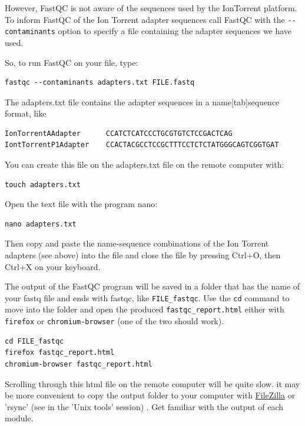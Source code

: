 \documentclass[11pt]{article}
\begin{document}
However, FastQC is not aware of the sequences used by the IonTorrent
platform. To inform FastQC of the Ion Torrent adapter sequences
call FastQC with the \texttt{-{}-contaminants} option to specify a file
containing the adapter sequences we have used.

So, to run FastQC on your file, type:

\begin{verbatim}
fastqc --contaminants adapters.txt FILE.fastq
\end{verbatim}

The adapters.txt file contains the adapter sequences in a
name[tab]sequence format, like

\begin{verbatim}
IonTorrentAAdapter      CCATCTCATCCCTGCGTGTCTCCGACTCAG
IontTorrentP1Adapter    CCACTACGCCTCCGCTTTCCTCTCTATGGGCAGTCGGTGAT
\end{verbatim}

You can create this file on the adapters.txt file on the remote computer with:

\begin{verbatim}
touch adapters.txt
\end{verbatim}

Open the text file with the program nano:

\begin{verbatim}
nano adapters.txt
\end{verbatim}

Then copy and paste the name-sequence combinations of the Ion Torrent
adapters (see above) into the file and close the file by pressing
Ctrl+O, then Ctrl+X on your keyboard.

The output of the FastQC program will be saved in a folder that has
the name of your fastq file and ends with fastqc, like
\texttt{FILE\_fastqc}. Use the \texttt{cd} command to move into the folder and open
the produced \texttt{fastqc\_report.html} either with \texttt{firefox} or
\texttt{chromium-browser} (one of the two should work).

\begin{verbatim}
cd FILE_fastqc
firefox fastqc_report.html
chromium-browser fastqc_report.html
\end{verbatim}

Scrolling through this html file on the remote computer will be quite
slow. it may be more convenient to copy the output folder to your
computer with \href{https://filezilla-project.org/}{FileZilla} or 'rsync' (see in the 'Unix tools' session) .
Get familiar with the output of each module.
\end{document}
